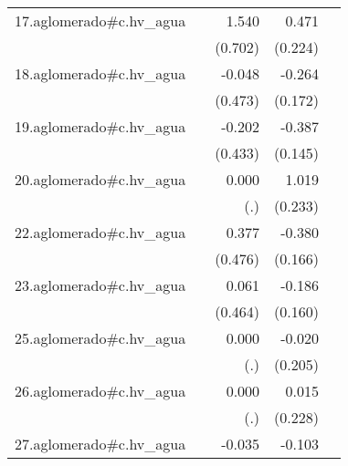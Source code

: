 {\begin{longtable}{l*{4}{D{.}{.}{-1}}}
\addlinespace
17.aglomerado#c.hv\_agua&                     &       1.540\sym{*}  &       0.471\sym{*}  &                     \\
            &                     &     (0.702)         &     (0.224)         &                     \\
\addlinespace
18.aglomerado#c.hv\_agua&                     &      -0.048         &      -0.264         &                     \\
            &                     &     (0.473)         &     (0.172)         &                     \\
\addlinespace
19.aglomerado#c.hv\_agua&                     &      -0.202         &      -0.387\sym{**} &                     \\
            &                     &     (0.433)         &     (0.145)         &                     \\
\addlinespace
20.aglomerado#c.hv\_agua&                     &       0.000         &       1.019\sym{***}&                     \\
            &                     &         (.)         &     (0.233)         &                     \\
\addlinespace
22.aglomerado#c.hv\_agua&                     &       0.377         &      -0.380\sym{*}  &                     \\
            &                     &     (0.476)         &     (0.166)         &                     \\
\addlinespace
23.aglomerado#c.hv\_agua&                     &       0.061         &      -0.186         &                     \\
            &                     &     (0.464)         &     (0.160)         &                     \\
\addlinespace
25.aglomerado#c.hv\_agua&                     &       0.000         &      -0.020         &                     \\
            &                     &         (.)         &     (0.205)         &                     \\
\addlinespace
26.aglomerado#c.hv\_agua&                     &       0.000         &       0.015         &                     \\
            &                     &         (.)         &     (0.228)         &                     \\
\addlinespace
27.aglomerado#c.hv\_agua&                     &      -0.035         &      -0.103         &                     \\

\end{longtable}}
